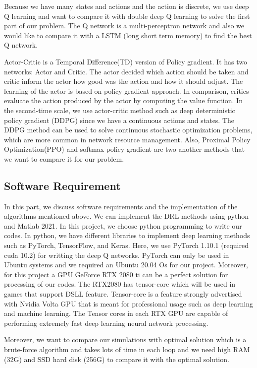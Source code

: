 \documentclass{article}
\begin{document}
Because we have many states and actions and the action is discrete, we use deep Q learning and want to compare it with double deep Q learning to solve the first part of our problem. The Q network is a multi-perceptron network and also we would like to compare it with a LSTM (long short term memory) to find the best Q network. 

Actor-Critic is a Temporal Difference(TD) version of Policy gradient. It has two networks: Actor and Critic. The actor decided which action should be taken and critic inform the actor how good was the action and how it should adjust. The learning of the actor is based on policy gradient approach. In comparison, critics evaluate the action produced by the actor by computing the value function. 
In the second-time scale, we use actor-critic method such as deep deterministic policy gradient (DDPG) since we have a continuous actions and states.
The DDPG method can be used to solve continuous stochastic optimization problems, which are more common in network resource management. Also, Proximal Policy Optimization(PPO) and softmax policy gradient are two another methods that we want to compare it for our problem. 
\subsection{Software Requirement}
In this part, we discuss software requirements and the implementation of the algorithms mentioned above. 
We can implement the DRL methods using python and Matlab 2021. In this project, we choose python programming to write our codes. In python, we have different libraries to implement deep learning methods such as PyTorch, TensorFlow, and Keras. Here, we use PyTorch 1.10.1 (required cuda 10.2) for writting the deep Q networks. PyTorch can only be used in Ubuntu systems and we required an Ubuntu 20.04 Os for our project. 
Moreover, for this project a GPU GeForce RTX 2080 ti can be a perfect solution for processing of our codes. 
The RTX2080 has tensor-core which will be used in games that support DSLL feature. Tensor-core is a feature strongly advertised with Nvidia Volta GPU that is meant for professional usage such as deep learning and machine learning.
The Tensor cores in each RTX GPU are capable of performing extremely fast deep learning neural network processing.

Moreover, we want to compare our simulations with optimal solution which is a brute-force algorithm and takes lots of time in each loop and we need high RAM (32G) and SSD hard disk (256G) to compare it with the optimal solution.  
 




\vspace{20mm}
\end{document}
